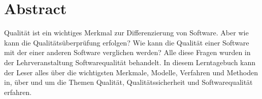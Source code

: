 \chapter{Abstract}
Qualität ist ein wichtiges Merkmal zur Differenzierung von Software. Aber wie kann die Qualitätsüberprüfung erfolgen? Wie kann die Qualität einer Software mit der einer anderen Software verglichen werden? Alle diese Fragen wurden in der Lehrveranstaltung Softwarequalität behandelt. In diesem Lerntagebuch kann der Leser alles über die wichtigsten Merkmale, Modelle, Verfahren und Methoden in, über und um die Themen Qualität, Qualitätssicherheit und Softwarequalität erfahren.